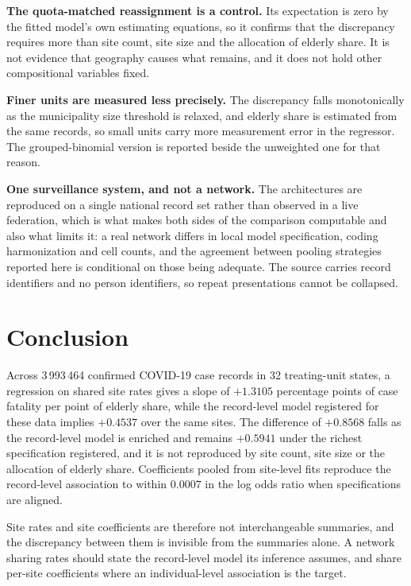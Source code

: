\documentclass[11pt]{article}
\begin{document}
\textbf{The quota-matched reassignment is a control.}  Its expectation
is zero by the fitted model's own estimating equations, so it confirms
that the discrepancy requires more than site count, site size and the
allocation of elderly share.  It is not evidence that geography causes
what remains, and it does not hold other compositional variables fixed.

\textbf{Finer units are measured less precisely.}  The discrepancy
falls monotonically as the municipality size threshold is relaxed, and
elderly share is estimated from the same records, so small units carry
more measurement error in the regressor.  The grouped-binomial version
is reported beside the unweighted one for that reason.

\textbf{One surveillance system, and not a network.}  The architectures
are reproduced on a single national record set rather than observed in
a live federation, which is what makes both sides of the comparison
computable and also what limits it: a real network differs in local
model specification, coding harmonization and cell counts, and the
agreement between pooling strategies reported here is conditional on
those being adequate.  The source carries record identifiers and no
person identifiers, so repeat presentations cannot be collapsed.

\section{Conclusion}

Across 3\,993\,464 confirmed COVID-19 case records in 32 treating-unit
states, a regression on shared site rates gives a slope of $+1.3105$
percentage points of case fatality per point of elderly share, while
the record-level model registered for these data implies $+0.4537$ over
the same sites.  The difference of $+0.8568$ falls as the record-level
model is enriched and remains $+0.5941$ under the richest specification
registered, and it is not reproduced by site count, site size or the
allocation of elderly share.  Coefficients pooled from site-level fits
reproduce the record-level association to within $0.0007$ in the log
odds ratio when specifications are aligned.

Site rates and site coefficients are therefore not interchangeable
summaries, and the discrepancy between them is invisible from the
summaries alone.  A network sharing rates should state the
record-level model its inference assumes, and share per-site
coefficients where an individual-level association is the target.
\end{document}
